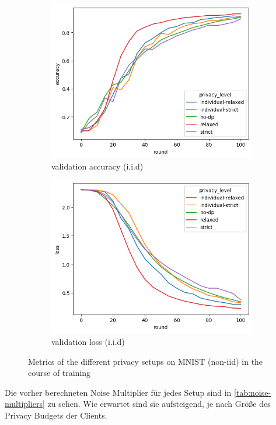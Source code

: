 \begin{figure}
\begin{subfigure}{0.4\textwidth}
		\includegraphics[width=\textwidth]{Bilder/emnist-accuracy-iid.png}
		\caption{validation accuracy (i.i.d)}
	\end{subfigure}
	\begin{subfigure}{0.4\textwidth}
		\centering
		\includegraphics[width=\textwidth]{Bilder/emnist-loss-iid.png}
		\caption{validation loss (i.i.d)}
	\end{subfigure}
	\caption{Metrics of the different privacy setups on MNIST (non-iid) in the course of training}
	\label{fig:fed-emnist-results}
\end{figure}

Die vorher berechneten Noise Multiplier für jedes Setup sind in \autoref{tab:noise-multipliers} zu sehen. Wie erwartet sind sie aufsteigend, je nach Größe des Privacy Budgets der Clients.

